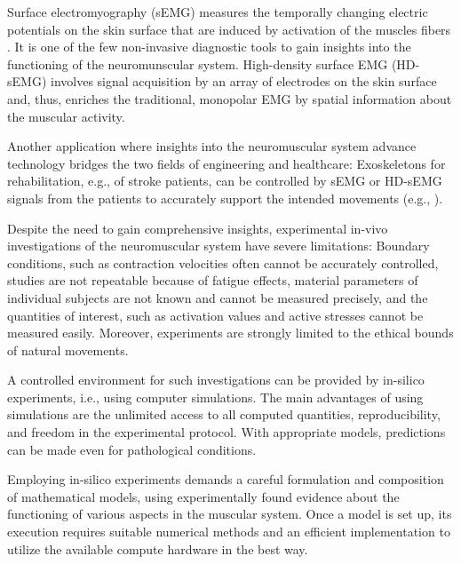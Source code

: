 Surface electromyography (sEMG) measures the temporally changing electric potentials on the skin surface that are induced by activation of the muscles fibers \cite{Merletti2004}. It is one of the few non-invasive diagnostic tools to gain insights into the functioning of the neuromunscular system.
High-density surface EMG (HD-sEMG) involves signal acquisition by an array of electrodes on the skin surface and, thus, enriches the traditional, monopolar EMG by spatial information about the muscular activity. 

Another application where insights into the neuromuscular system advance technology bridges the two fields of engineering and healthcare: Exoskeletons for rehabilitation, e.g., of stroke patients, can be controlled by sEMG or HD-sEMG signals from the patients to accurately support the intended movements (e.g., \cite{Leonardis2015,Mulas2005,Andreasen2005}).

Despite the need to gain comprehensive insights, experimental in-vivo investigations of the neuromuscular system have severe limitations: Boundary conditions, such as contraction velocities often cannot be accurately controlled, studies are not repeatable because of fatigue effects, material parameters of individual subjects are not known and cannot be measured precisely, and the quantities of interest, such as  activation values and active stresses cannot be measured easily. Moreover, experiments are strongly limited to the ethical bounds of natural movements. 

A controlled environment for such investigations can be provided by in-silico experiments, i.e., using computer simulations. The main advantages of using simulations are the unlimited access to all computed quantities, reproducibility, and freedom in the experimental protocol.
With appropriate models, predictions can be made even for pathological conditions.

Employing in-silico experiments demands a careful formulation and composition of mathematical models, using experimentally found evidence about the functioning of various aspects in the muscular system. Once a model is set up, its execution requires suitable numerical methods and an efficient implementation to utilize the available compute hardware in the best way.


